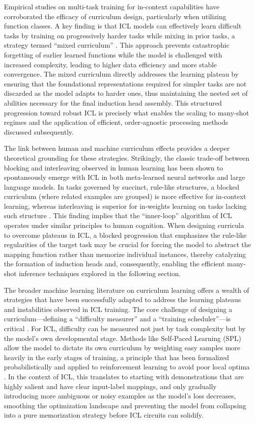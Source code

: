 \documentclass[11pt]{article}
\begin{document}
Empirical studies on multi-task training for in-context capabilities have corroborated the efficacy of curriculum design, particularly when utilizing function classes. A key finding is that ICL models can effectively learn difficult tasks by training on progressively harder tasks while mixing in prior tasks, a strategy termed ``mixed curriculum'' \cite{ref189}. This approach prevents catastrophic forgetting of earlier learned functions while the model is challenged with increased complexity, leading to higher data efficiency and more stable convergence. The mixed curriculum directly addresses the learning plateau by ensuring that the foundational representations required for simpler tasks are not discarded as the model adapts to harder ones, thus maintaining the nested set of abilities necessary for the final induction head assembly. This structured progression toward robust ICL is precisely what enables the scaling to many-shot regimes and the application of efficient, order-agnostic processing methods discussed subsequently.

The link between human and machine curriculum effects provides a deeper theoretical grounding for these strategies. Strikingly, the classic trade-off between blocking and interleaving observed in human learning has been shown to spontaneously emerge with ICL in both meta-learned neural networks and large language models. In tasks governed by succinct, rule-like structures, a blocked curriculum (where related examples are grouped) is more effective for in-context learning, whereas interleaving is superior for in-weights learning on tasks lacking such structure \cite{ref75}. This finding implies that the ``inner-loop'' algorithm of ICL operates under similar principles to human cognition. When designing curricula to overcome plateaus in ICL, a blocked progression that emphasizes the rule-like regularities of the target task may be crucial for forcing the model to abstract the mapping function rather than memorize individual instances, thereby catalyzing the formation of induction heads and, consequently, enabling the efficient many-shot inference techniques explored in the following section.

The broader machine learning literature on curriculum learning offers a wealth of strategies that have been successfully adapted to address the learning plateaus and instabilities observed in ICL training. The core challenge of designing a curriculum---defining a ``difficulty measurer'' and a ``training scheduler''---is critical \cite{ref199}. For ICL, difficulty can be measured not just by task complexity but by the model's own developmental stage. Methods like Self-Paced Learning (SPL) allow the model to dictate its own curriculum by weighting easy samples more heavily in the early stages of training, a principle that has been formalized probabilistically and applied to reinforcement learning to avoid poor local optima \cite{ref201}. In the context of ICL, this translates to starting with demonstrations that are highly salient and have clear input-label mappings, and only gradually introducing more ambiguous or noisy examples as the model's loss decreases, smoothing the optimization landscape and preventing the model from collapsing into a pure memorization strategy before ICL circuits can solidify.
\end{document}
